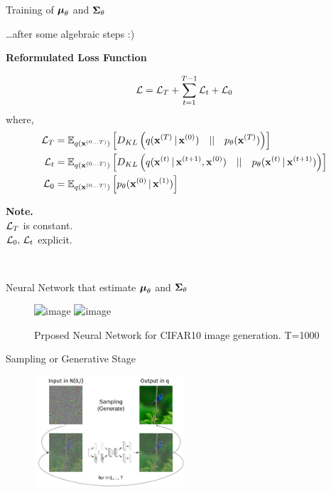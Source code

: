\documentclass[aspectratio=169, 10pt]{beamer}
\theoremstyle{definition}
\begin{document}
\begin{frame}{Training of ${\boldsymbol{\mu}}_\theta$ and  ${\boldsymbol{\Sigma}}_\theta$}
  \begin{minipage}[t]{0.75\textwidth}
\ldots after some algebraic steps :)
  \begin{center}
    \bf
    Reformulated Loss Function
  \end{center}
  \[
    \mathcal{L} = \mathcal{L}_T + \sum_{t=1}^{T-1}\mathcal{L}_t + \mathcal{L}_0
  \]
  where, 
  \[
    \begin{aligned}
      \mathcal{L}_T &= \mathbb{E}_{q({\mathbf{x}}^{(0\ldots T)})}\left[ D_{KL}\left(
      q({\mathbf{x}}^{(T)}\,\vert\, {\mathbf{x}}^{(0)}) \quad||\quad p_\theta({\mathbf{x}}^{(T)}) \right)
    \right] \\
     \mathcal{L}_t &= \mathbb{E}_{q({\mathbf{x}}^{(0\ldots T)})}\left[ D_{KL}\left(
        q({\mathbf{x}}^{(t)}\,\vert\, {\mathbf{x}}^{(t+1)},{\mathbf{x}}^{(0)}) \quad||\quad
      p_\theta({\mathbf{x}}^{(t)}\,\vert\, {\mathbf{x}}^{(t+1)}) \right)
    \right]
    \\
    \mathcal{L}_0 &= \mathbb{E}_{q({\mathbf{x}}^{(0\ldots T)})}\left[ p_\theta({\mathbf{x}}^{(0)}\,\vert\, {\mathbf{x}}^{(1)}) \right]
  \end{aligned}
  \]
\end{minipage}\hfill%
\begin{minipage}[t]{0.20\textwidth}
  \vspace{4cm}
  \textbf{Note.}\\
  $\mathcal{L}_T$ is constant.\\
  $\mathcal{L}_0,\,\mathcal{L}_t$ explicit.\\
\end{minipage}\\
\end{frame}
\begin{frame}{Neural Network that estimate ${\boldsymbol{\mu}}_\theta$ and
  ${\boldsymbol{\Sigma}}_\theta$}
  \begin{figure}[h!]
    \centering
    \includegraphics<1>[width=0.45\textwidth]{./pic/diff_net_1.png}%
    \includegraphics<2>[width=0.45\textwidth]{./pic/diff_net_2.png}%
  \caption{Prposed Neural Network for CIFAR10 image generation. T=1000}
  \end{figure}
\end{frame}
\begin{frame}{Sampling or Generative Stage}
  \begin{figure}[h]
    \centering
    \includegraphics[width=0.5\textwidth]{./pic/sampling.png}
  \end{figure}
\end{frame}
\end{document}
